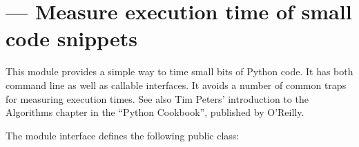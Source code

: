 \section{ ---
         Measure execution time of small code snippets}




This module provides a simple way to time small bits of Python code.  It has
both command line as well as callable interfaces.  It avoids a number of
common traps for measuring execution times.  See also Tim Peters'
introduction to the Algorithms chapter in the ``Python Cookbook'', published
by O'Reilly.

The module interface defines the following public class:


